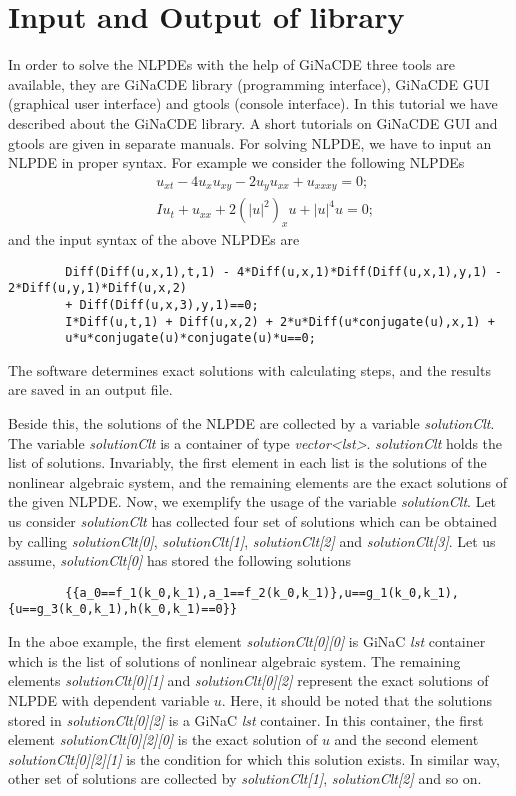 \documentclass[prd,aps,floats,showkeys,nofootinbib,notitlepage]{revtex4-2}
\begin{document}
	\section{Input and Output of library}
	In order to solve the NLPDEs with the help of GiNaCDE three tools are available, they are GiNaCDE library (programming interface), GiNaCDE GUI (graphical user interface) and gtools (console interface). In this tutorial we have described about the GiNaCDE library. A short tutorials on GiNaCDE GUI and gtools are given in separate manuals. For solving NLPDE, we have to input an NLPDE in proper syntax. For example we consider the following NLPDEs
	\begin{align}
		&{u_{xt}} - 4{u_x}{u_{xy}} - 2{u_y}{u_{xx}} + {u_{xxxy}} = 0;\\
		&I{u_t} + {u_{xx}} + 2{\left( {{{\left| u \right|}^2}} \right)_x}u + {\left| u \right|^4}u = 0;
	\end{align}
	and the input syntax of the above NLPDEs are
	\begin{verbatim}
		Diff(Diff(u,x,1),t,1) - 4*Diff(u,x,1)*Diff(Diff(u,x,1),y,1) - 2*Diff(u,y,1)*Diff(u,x,2)
		+ Diff(Diff(u,x,3),y,1)==0;
		I*Diff(u,t,1) + Diff(u,x,2) + 2*u*Diff(u*conjugate(u),x,1) + 
		u*u*conjugate(u)*conjugate(u)*u==0;
	\end{verbatim}   
	
	\par The software determines exact solutions with calculating steps, and the results are saved in an output file.
	
	Beside this, the solutions of the NLPDE are collected by a variable {\em solutionClt}. The variable {\em solutionClt} is a container of type {\em vector<lst>}.
	{\em solutionClt} holds the list of solutions. Invariably, the first element in each list is the solutions of the nonlinear algebraic system, and the remaining elements are the exact solutions of the given NLPDE.
	Now, we exemplify the usage of the variable {\em solutionClt}. Let us consider {\em solutionClt} has collected four set of solutions which can be obtained by calling {\em solutionClt[0]}, {\em solutionClt[1]}, {\em solutionClt[2]} and {\em solutionClt[3]}. Let us assume, {\em solutionClt[0]} has stored the following solutions
	\begin{verbatim}
		{{a_0==f_1(k_0,k_1),a_1==f_2(k_0,k_1)},u==g_1(k_0,k_1),{u==g_3(k_0,k_1),h(k_0,k_1)==0}}
	\end{verbatim}
	In the aboe example, the first element {\em solutionClt[0][0]} is GiNaC {\em lst} container which is the list of solutions of nonlinear algebraic system. The remaining elements {\em solutionClt[0][1]} and {\em solutionClt[0][2]} represent the exact solutions of NLPDE with dependent variable $u$. Here, it should be noted that the solutions stored in {\em solutionClt[0][2]} is a GiNaC {\em lst} container. In this container, the first element {\em solutionClt[0][2][0]} is the exact solution of $u$ and the second element {\em solutionClt[0][2][1]} is the condition for which this solution exists.
	In similar way, other set of solutions are collected by {\em solutionClt[1]}, {\em solutionClt[2]} and so on.
	
\end{document}

